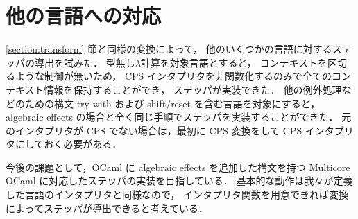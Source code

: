 \section{他の言語への対応}
\label{lang}

\ref{section:transform} 節と同様の変換によって，
他のいくつかの言語に対するステッパの導出を試みた．
型無し$\lambda$計算を対象言語とすると，
コンテキストを区切るような制御が無いため，
CPS インタプリタを非関数化するのみで全てのコンテキスト情報を保持することができ，
ステッパが実装できた．
他の例外処理などのための構文 try-with および shift/reset を含む言語を対象にすると，
algebraic effects の場合と全く同じ手順でステッパを実装することができた．
元のインタプリタが CPS でない場合は，最初に CPS 変換をして CPS インタプリタにしておく必要がある．

今後の課題として，OCaml に algebraic effects を追加した構文を持つ
Multicore OCaml に対応したステッパの実装を目指している．
基本的な動作は我々が定義した言語のインタプリタと同様なので，
インタプリタ関数を用意できれば変換によってステッパが導出できると考えている．
